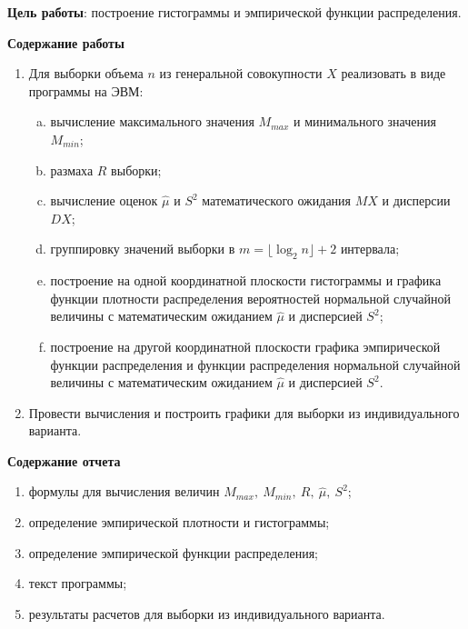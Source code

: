 \Introduction

\textbf{Цель работы}: построение гистограммы и эмпирической функции распределения.

\textbf{Содержание работы}

\begin{enumerate}
	\item Для выборки объема $n$ из генеральной совокупности $X$ реализовать в виде программы на ЭВМ:

	\begin{enumerate}[a)]
		\item вычисление максимального значения $M_{max}$ и минимального значения $M_{min}$;
		
		\item размаха $R$ выборки;
		
		\item вычисление оценок $\hat{\mu}$ и $S^2$ математического ожидания $MX$ и дисперсии $DX$;
		
		\item группировку значений выборки в $m=\lfloor\log_2n\rfloor+2$ интервала;
		
		\item построение на одной координатной плоскости гистограммы и графика функции плотности распределения вероятностей нормальной случайной величины с математическим
ожиданием $\hat{\mu}$ и дисперсией $S^2$;
		
		\item построение на другой координатной плоскости графика эмпирической функции распределения и функции распределения нормальной случайной величины с математическим ожиданием $\hat{\mu}$ и дисперсией $S^2$.
	\end{enumerate}

	\item Провести вычисления и построить графики для выборки из индивидуального варианта.
\end{enumerate}

\textbf{Содержание отчета}

\begin{enumerate}
	\item формулы для вычисления величин $M_{max},~M_{min},~R,~\hat{\mu},~S^2$;
	\item определение эмпирической плотности и гистограммы;
	\item определение эмпирической функции распределения;
	\item текст программы;
	\item результаты расчетов для выборки из индивидуального варианта.
\end{enumerate}
